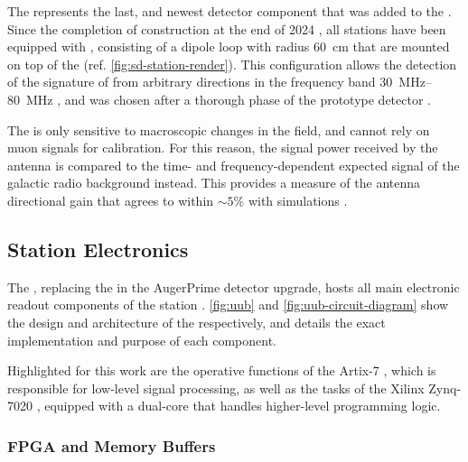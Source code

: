 The \RD represents the last, and newest detector component that was added to 
the \SD. Since the completion of construction at the end of 2024 
\cite{castellinaSeasonalGreetings202424}, all \SD stations have been equipped
with \SALLAs, consisting of a dipole loop with radius \SI{60}{\centi\meter} 
that are mounted on top of the \SSD (ref. \cref{fig:sd-station-render}). This 
configuration allows the detection of the \EM signature of \EASs from arbitrary
directions in the frequency band 
\SIrange[range-units = single]{30}{80}{\mega\hertz} 
\cite{pontLargeRadioDetector2021}, and was chosen after a thorough \RND phase 
of the \AERA prototype detector \cite{aabPierreAugerObservatory2020, 
fuchsAugerEngineeringRadio2012, aabEnergyEstimationCosmic2016}.

The \RD is only sensitive to macroscopic changes in the \EM field, and cannot 
rely on muon signals for calibration. For this reason, the signal power 
received by the antenna is compared to the time- and frequency-dependent 
expected signal of the galactic radio background instead. This provides a 
measure of the antenna directional gain that agrees to within $\sim5\%$ with 
simulations \cite{huegeRadioDetectorPierre2023, 
fodranFirstResultsAugerPrime2022}.

\subsection{Station Electronics}
\label{ssec:uub}

The \UUB, replacing the \UB in the AugerPrime detector upgrade, hosts all main 
electronic readout components of the station 
\cite{collaborationPierreAugerObservatory2016}. \cref{fig:uub} and 
\cref{fig:uub-circuit-diagram} show the design and architecture of the \UUB 
\PCB respectively, and \cite{suomijarviNewElectronicsSurface2018} details the 
exact implementation and purpose of each component. 

Highlighted for this work are the operative functions of the Artix-7 \FPGA 
\cite{xilinx7SeriesFPGAs2020}, which is responsible for low-level signal 
processing, as well as the tasks of the Xilinx Zynq-7020 \SOC, equipped with a
dual-core \CPU \cite{amdZynq7000SoC2023} that handles higher-level programming 
logic. 

\subsubsection{FPGA and Memory Buffers}
\label{sssec:fpga-buffers}

